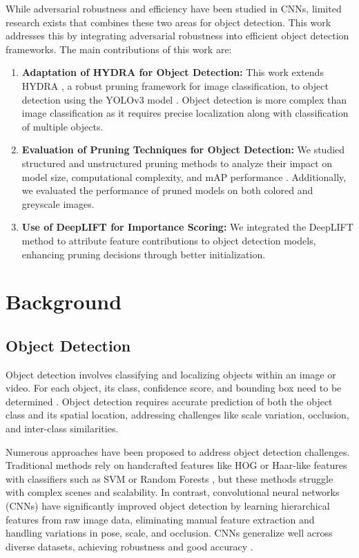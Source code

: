 \documentclass[10pt]{cai}
\begin{document}
While adversarial robustness and efficiency have been studied in CNNs, limited research exists that combines these two areas for object detection. This work addresses this by integrating adversarial robustness into efficient object detection frameworks. The main contributions of this work are:

\begin{enumerate}
    \item \textbf{Adaptation of HYDRA for Object Detection:} This work extends HYDRA \cite{hydra}, a robust pruning framework for image classification, to object detection using the YOLOv3 model \cite{redmon2018yolov3incrementalimprovement}. Object detection is more complex than image classification as it requires precise localization along with classification of multiple objects.
    \item \textbf{Evaluation of Pruning Techniques for Object Detection:} We studied structured and unstructured pruning methods to analyze their impact on model size, computational complexity, and mAP performance \cite{iou}. Additionally, we evaluated the performance of pruned models on both colored and greyscale images.
    \item \textbf{Use of DeepLIFT for Importance Scoring:} We integrated the DeepLIFT method to attribute feature contributions to object detection models, enhancing pruning decisions through better initialization.
\end{enumerate}

\section{Background}
\subsection{Object Detection}
\label{secmAP}
Object detection involves classifying and localizing objects within an image or video. For each object, its class, confidence score, and bounding box need to be determined \cite{8627998}. Object detection requires accurate prediction of both the object class and its spatial location, addressing challenges like scale variation, occlusion, and inter-class similarities.

Numerous approaches have been proposed to address object detection challenges. Traditional methods rely on handcrafted features like HOG or Haar-like features with classifiers such as SVM or Random Forests \cite{10099639}, but these methods struggle with complex scenes and scalability. In contrast, convolutional neural networks (CNNs) have significantly improved object detection by learning hierarchical features from raw image data, eliminating manual feature extraction and handling variations in pose, scale, and occlusion. CNNs generalize well across diverse datasets, achieving robustness and good accuracy \cite{cnnvstrad}. 
\end{document}
